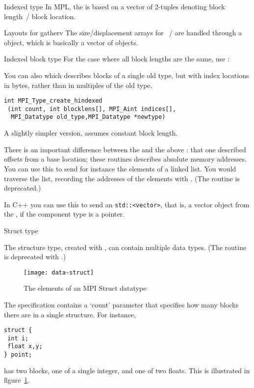 \begin{mplnote}{Indexed type}
  In \ac{MPL}, the  is based on a vector
  of 2-tuples denoting block length~/ block location.
\end{mplnote}

\begin{mplnote}{Layouts for gatherv}
  The size/displacement arrays for ~/
   are handled through a
   object, which is basically a vector of
   objects.
\end{mplnote}

\begin{mplnote}{Indexed block type}
  For the case where all block lengths are the same,
  use :
\end{mplnote}

You can also  which describes blocks
of a single old type, but with index locations in bytes, rather than
in multiples of the old type.
\begin{lstlisting}
int MPI_Type_create_hindexed
 (int count, int blocklens[], MPI_Aint indices[],
  MPI_Datatype old_type,MPI_Datatype *newtype)
\end{lstlisting}
A slightly simpler version,
assumes constant block length.

There is an important difference between the  and the
above : that one described offsets from
a base location; these routines describes absolute memory addresses.
You can use this to send for instance the elements of a linked list.
You would traverse the list, recording the addresses of the
elements with .
(The routine  is deprecated.)

In C++ you can use this to
send an \lstinline{std::<vector>}, that
is, a vector object from the , if
the component type is a pointer.

 {Struct type}
\label{sec:data:struct}

The structure type, created with ,
can contain multiple data types. (The routine
 is deprecated with .)
%
\begin{figure}[t]
  \texttt{[image: data-struct]}
  \caption{The elements of an MPI Struct datatype}
  \label{fig:data-struct}
\end{figure}
%
The specification contains a `count' parameter that specifies how many blocks
there are in a single structure. For instance,
\begin{lstlisting}
struct {
 int i;
 float x,y;
} point;
\end{lstlisting}
has two blocks, one of a single integer, and one of two floats.
This is illustrated in figure~\ref{fig:data-struct}.

